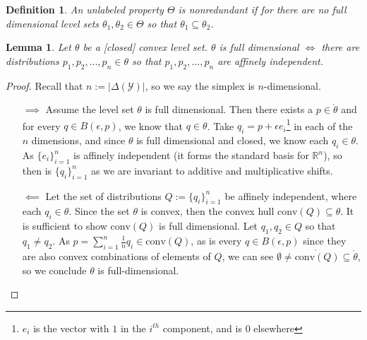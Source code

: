 \documentclass[12pt]{article}
\newcommand{\reals}{\mathbb{R}}
\newcommand{\Y}{\mathcal{Y}}
\newcommand{\inter}[1]{\mathring{#1}}%
\newcommand{\conv}{\mathrm{conv}}
\newtheorem{lemma}{Lemma}
\newtheorem{definition}{Definition}
\begin{document}
\begin{definition}\label{def:unlabeled-nonredundant}
	An unlabeled property $\Theta$ is \emph{nonredundant} if for there are no full dimensional level sets $\theta_1, \theta_2 \in \Theta$ so that $\theta_1 \subseteq \theta_2$.
\end{definition}


\begin{lemma}\label{lem:nonempty-inter-iff-aff-ind}
	Let $\theta$ be a [closed] convex level set.
	$\theta$ is full dimensional $\iff$ there are distributions $p_1, p_2, \ldots, p_n \in \theta$ so that $p_1, p_2, \ldots, p_n$ are affinely independent.
\end{lemma}
\begin{proof}
	Recall that $n := |\Delta(\Y)|$, so we say the simplex is $n$-dimensional.
	\begin{enumerate}
		\item [$\implies$]
		Assume the level set $\theta$ is full dimensional.
		Then there exists a $p \in \inter{\theta}$ and for every $q \in B(\epsilon, p)$, we know that $q \in \theta$.
		Take $q_i = p + \epsilon e_i$\footnote{$e_i$ is the vector with $1$ in the $i^{th}$ component, and is $0$ elsewhere} in each of the $n$ dimensions, and since $\theta$ is full dimensional and closed, we know each $q_i \in\theta$.
		As $\{e_i\}_{i=1}^n$ is affinely independent (it forms the standard basis for $\reals^n$), so then is $\{q_i\}_{i=1}^n$ as we are invariant to additive and multiplicative shifts.		
		
		\item [$\impliedby$]
		Let the set of distributions $Q := \{q_i\}_{i=1}^n$ be affinely independent, where each $q_i \in \theta$.
		Since the set $\theta$ is convex, then the convex hull $\conv(Q) \subseteq \theta$.
		It is sufficient to show $\conv(Q)$ is full dimensional.
		Let $q_1, q_2 \in Q$ so that $q_1 \neq q_2$.
		As $p = \sum_{i=1}^n \frac{1}{n}q_i \in \conv(Q)$, as is every $q \in B(\epsilon, p)$ since they are also convex combinations of elements of $Q$, we can see $\emptyset \neq \inter{\conv(Q)} \subseteq \inter{\theta}$, so we conclude $\theta$ is full-dimensional.
	\end{enumerate}
\end{proof}
\end{document}
